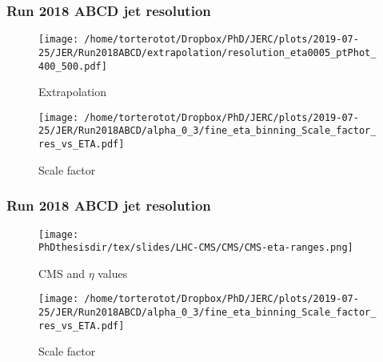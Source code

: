 \begin{frame}
\frametitle{Run 2018 ABCD jet resolution}
\begin{minipage}{.45\textwidth}
\begin{figure}
\texttt{[image: /home/torterotot/Dropbox/PhD/JERC/plots/2019-07-25/JER/Run2018ABCD/extrapolation/resolution\_eta0005\_ptPhot\_400\_500.pdf]}
\caption{Extrapolation}
\end{figure}
\end{minipage}
\hfill
\begin{minipage}{.45\textwidth}
\begin{figure}
\texttt{[image: /home/torterotot/Dropbox/PhD/JERC/plots/2019-07-25/JER/Run2018ABCD/alpha\_0\_3/fine\_eta\_binning\_Scale\_factor\_res\_vs\_ETA.pdf]}
\caption{Scale factor}
\end{figure}
\end{minipage}
\end{frame}

\begin{frame}\addtocounter{framenumber}{-1}
\frametitle{Run 2018 ABCD jet resolution}
\begin{minipage}{.45\textwidth}
\begin{figure}
\texttt{[image: \\PhDthesisdir/tex/slides/LHC-CMS/CMS/CMS-eta-ranges.png]}
\caption{CMS and $\eta$ values}
\end{figure}
\end{minipage}
\hfill
\begin{minipage}{.45\textwidth}
\begin{figure}
\texttt{[image: /home/torterotot/Dropbox/PhD/JERC/plots/2019-07-25/JER/Run2018ABCD/alpha\_0\_3/fine\_eta\_binning\_Scale\_factor\_res\_vs\_ETA.pdf]}
\caption{Scale factor}
\end{figure}
\end{minipage}
\end{frame}